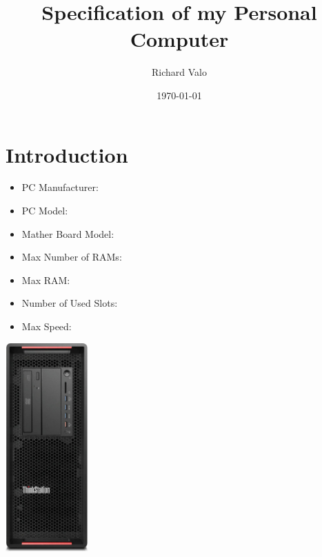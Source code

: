 \documentclass{article}
\title{Specification of my Personal Computer}
\author{Richard Valo}
\date{\today}
\begin{document}
\maketitle

\section{Introduction}
\begin{itemize}
  \item PC Manufacturer:
  \item PC Model:
  \item Mather Board Model:
  \item Max Number of RAMs:
  \item Max RAM:
  \item Number of Used Slots:
  \item Max Speed:
\end{itemize}
\href{https://www.getech.co.uk/pdf/p5001.pdf}{\includegraphics[height=8cm]{PC.jpg}}
\end{document}
